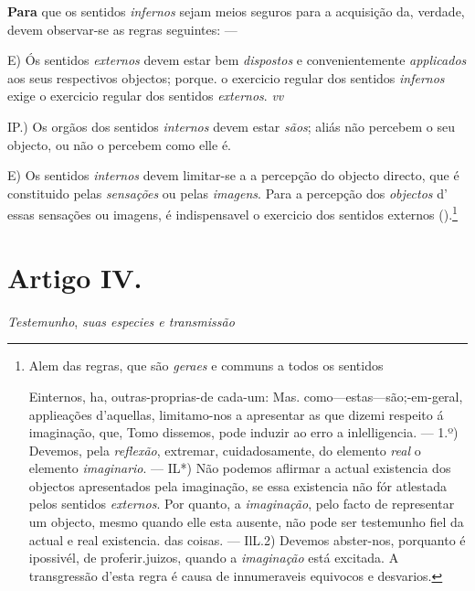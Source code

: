 
 
\textbf{Para} que os sentidos \emph{infernos} sejam meios seguros para a acquisição da, verdade, devem observar-se as regras seguintes: ---

E) Ós sentidos \emph{externos} devem estar bem \emph{dispostos} e convenientemente \emph{applicados} aos seus respectivos objectos; porque. o exercicio regular dos sentidos \emph{infernos} exige o exercicio regular dos sentidos \emph{externos}. \emph{vv}

IP.) Os orgãos dos sentidos \emph{internos} devem estar \emph{sãos}; aliás não percebem o seu objecto, ou não o percebem como elle é.

E) Os sentidos \emph{internos} devem limitar-se a a percepção do objecto directo, que é constituido pelas \emph{sensações} ou pelas \emph{imagens}. Para a percepção dos \emph{objectos} d' essas sensações ou imagens, é indispensavel o exercicio dos sentidos externos ().\footnote{Alem das regras, que são \emph{geraes} e communs a todos os sentidos\par Einternos, ha, outras-proprias-de cada-um: Mas. como---estas---são;-em-geral, applieações d'aquellas, limitamo-nos a apresentar as que dizemi respeito á imaginação, que, Tomo dissemos, pode induzir ao erro a inlelligencia. --- 1.º) Devemos, pela \emph{reflexão}, extremar, cuidadosamente, do elemento \emph{real} o elemento \emph{imaginario}. --- IL*) Não podemos aflirmar a actual existencia dos objectos apresentados pela imaginação, se essa existencia não fór atlestada pelos sentidos \emph{externos}. Por quanto, a \emph{imaginação}, pelo facto de representar um objecto, mesmo quando elle esta ausente, não pode ser testemunho fiel da actual e real existencia. das coisas. --- IlL.2) Devemos abster-nos, porquanto é ipossivél, de proferir.juizos, quando a \emph{imaginação} está excitada. A transgressão d'esta regra é causa de innumeraveis equivocos e desvarios.}


\section*{Artigo IV.}

 \emph{Testemunho}, \emph{suas especies e transmissão}


